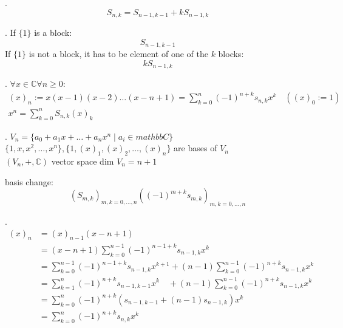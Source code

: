 \Theorem.
\[
  S_{n,k} = S_{n-1,k-1} + k S_{n-1,k}
\]

\Proof.
If $\{1\}$ is a block:
\[
  S_{n-1,k-1}
\]
If $\{1\}$ is not a block, it has to be element of one of the $k$ blocks:
\[
  k S_{n-1,k}
\]

\Theorem.
$\forall x\in \mathbb{C} \forall n ≥ 0:$
\begin{gather*}
  (x)_n
    := x(x-1)(x-2) \ldots(x-n+1)
    = \sum_{k=0}^{n} (-1)^{n+k} s_{n,k} x^k \quad ((x)_0:=1)
    \\
  x^n = \sum_{k=0}^{n} S_{n,k} (x)_k
\end{gather*}

\Remark.
$V_n = \{a_0 + a_1 x + \ldots + a_n x^n \mid a_i \in mathbb{C} \}$ \\
$\{1,x,x^2, \ldots , x^n\}, \{1,(x)_1, (x)_2, \ldots ,(x)_n\}$ are bases of $V_n$ \\
$(V_n, +, \mathbb{C})$ vector space dim $V_n = n+1$

basis change: 
\[
  (S_{m,k})_{m,k= 0, \ldots,n} 
    ((-1)^{m+k} s_{m,k})_{m,k= 0, \ldots,n}
\]

\Proof.
\begin{align*}
  (x)_n
  &= (x)_{n-1} (x-n+1) \\
  &= (x-n+1) \sum_{k=0}^{n-1} (-1)^{n-1+k} s_{n-1,k} x^k \\
  &= \sum_{k=0}^{n-1} (-1)^{n-1+k} s_{n-1,k} x^{k+1} 
    + (n-1)\sum_{k=0}^{n-1} (-1)^{n+k} s_{n-1,k} x^k \\
  &= \sum_{k=1}^n (-1)^{n+k} s_{n-1,k-1} x^k
    \quad + (n-1)\sum_{k=0}^{n-1} (-1)^{n+k} s_{n-1,k} x^k \\
  &= \sum_{k=0}^n (-1)^{n+k}
    (s_{n-1,k-1} + (n-1)s_{n-1,k}) x^k \\
  &= \sum_{k=0}^n (-1)^{n+k} s_{n,k} x^k \\
\end{align*}

